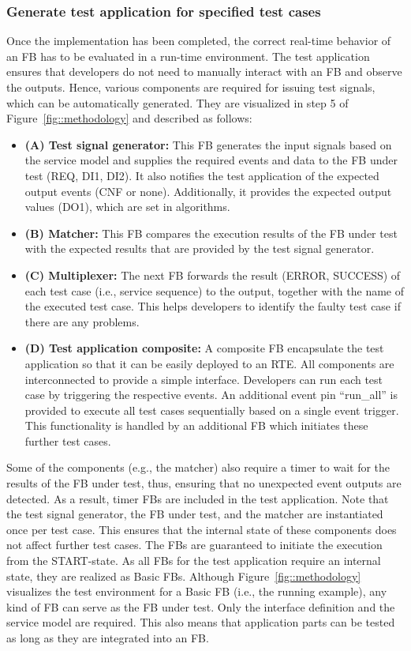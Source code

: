 \subsubsection{Generate test application for specified test cases}
    Once the implementation has been completed, the correct real-time behavior of an FB has to be evaluated in a run-time environment. The test application ensures that developers do not need to manually interact with an FB and observe the outputs. Hence, various components are required for issuing test signals, which can be automatically generated. They are visualized in step 5 of Figure~\ref{fig::methodology} and described as follows:
    \begin{itemize}
        \item \textbf{(A) Test signal generator:} This FB generates the input signals based on the service model and supplies the required events and data to the FB under test (REQ, DI1, DI2). It also notifies the test application of the expected output events (CNF or none). Additionally, it provides the expected output values (DO1), which are set in algorithms. 
        \item \textbf{(B) Matcher:} This FB compares the execution results of the FB under test with the expected results that are provided by the test signal generator. 
        \item \textbf{(C) Multiplexer: } The next FB forwards the result (ERROR, SUCCESS) of each test case (i.e., service sequence) to the output, together with the name of the executed test case. This helps developers to identify the faulty test case if there are any problems. 
        \item \textbf{(D) Test application composite: } A composite FB encapsulate the test application so that it can be easily deployed to an RTE. All components are interconnected to provide a simple interface. Developers can run each test case by triggering the respective events. An additional event pin ``run\_all'' is provided to execute all test cases sequentially based on a single event trigger. This functionality is handled by an additional FB which initiates these further test cases. 

    \end{itemize}
        Some of the components (e.g., the matcher) also require a timer to wait for the results of the FB under test, thus, ensuring that no unexpected event outputs are detected. As a result, timer FBs are included in the test application.
        Note that the test signal generator, the FB under test, and the matcher are instantiated once per test case. This ensures that the internal state of these components does not affect further test cases. The FBs are guaranteed to initiate the execution from the START-state. As all FBs for the test application require an internal state, they are realized as Basic FBs. Although Figure~\ref{fig::methodology} visualizes the test environment for a Basic FB (i.e., the running example), any kind of FB can serve as the FB under test. Only the interface definition and the service model are required. This also means that application parts can be tested as long as they are integrated into an FB.

